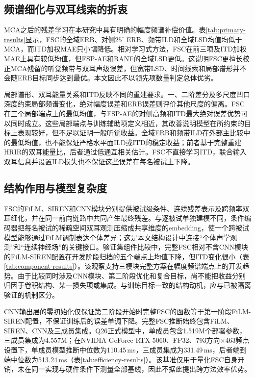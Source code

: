 \documentclass[UTF8,a4paper]{article}
\begin{document}
\subsection{频谱细化与双耳线索的折衷}
MCA之后的残差学习在本研究中具有明确的幅度频谱补偿价值。表\ref{tab:primary-results}显示，FSC的全域ERB、对侧$25^\circ$ ERB、频带ILD和全域LSD均值均低于MCA，而ITD加权MAE只小幅降低。相对学习式方法，FSC在前三项及ITD加权MAE上具有较低均值，但FSP-AE和RANF的全域LSD更低。这说明FSC更擅长校正MCA残留的听觉频带与双耳声级误差，但宽带LSD、时间线索和局部谱形并不会随ERB目标同步达到最优。本文因此不以领先项数量判定总体优劣。

局部谱形、双耳能量关系和ITD反映不同的重建要求。一、二阶差分及多尺度凹口深度约束局部频谱变化，绝对幅度误差和ERB误差则评价其他尺度的偏离。FSC在三个局部端点上的最低均值，与FSP-AE的对侧高频和ITD最大绝对误差优势可以同时成立。这些局部端点与训练辅助项定义相近，其改善说明模型在所约束的目标上表现较好，但不足以证明一般听觉收益。全域ERB和频带ILD在外部主比较中的最低均值，也不能保证严格水平面ILD或ITD的稳定收益；前者基于完整重建HRIR的双耳能量比，后者通过低通互相关估计。FSC不直接学习ITD，联合输入双耳信息并设置ILD损失也不保证这些误差在每名被试上下降。

\subsection{结构作用与模型复杂度}
FSC的FiLM、SIREN和CNN模块分别提供被试级条件、连续残差表示及跨频率双耳细化，并在同一前向链路中共同产生最终残差。与逐被试单独建模不同，条件编码器把每名被试的稀疏空间双耳观测压缩成共享维度的embedding，使一个跨被试模型能够通过FiLM调制表达个体差异；这是本文结构设计中连接“个体声学观测”和“连续神经场”的关键接口。验证集组件比较中，完整FSC相对不含CNN模块的FiLM-SIREN配置在开发阶段归档的五个端点上均值下降，但ITD变化很小（表\ref{tab:component-results}）。该观察支持三模块完整方案在幅度频谱端点上的开发趋势。由于比较同时涉及CNN模块、第二阶段优化和复合目标，尚不能把收益分别归因于卷积结构、某一损失项或集成。与训练目标一致的结构动机，应与已被隔离验证的机制区分。

CNN输出层的零初始化仅保证第二阶段开始时完整FSC的函数等于第一阶段FiLM-SIREN配置，不保证训练后的误差单调下降。完整FSC推断始终包含FiLM、SIREN、CNN及三成员集成。Q26正式模型中，单成员包含1.519M个部署参数，三成员集成为4.557M；在NVIDIA GeForce RTX 5060、FP32、793方向$\times$463频点设置下，单成员模型推断中位数为110.45\,ms，三成员集成为331.49\,ms，后者端到端中位数为513.24\,ms（表\ref{tab:efficiency-results}）。该基准仅用于量化FSC自身开销，未在同一实现与硬件条件下测量全部基线，因此不据此提出跨方法效率优势。
\end{document}
